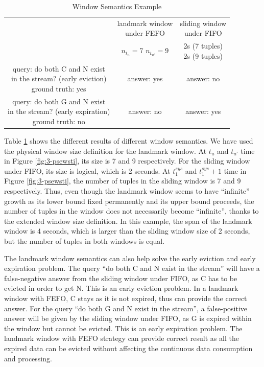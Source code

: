 \begin{table}[!htbp]
	\centering
	\caption{Window Semantics Example}
	\label{tab:lwsw}
	\begin{tabular}{|c||c|c|}
	\hline
	& \makecell{landmark window \\ under FEFO} & \makecell{sliding window \\ under FIFO} \\ \hhline{|=#=|=|}
	\makecell{window size} & \makecell{$n_{t_{u}} = 7$\\ $n_{t_{u'}} = 9$} & \makecell{2s (7 tuples)\\ 2s (9 tuples)} \\ \hline
	\makecell{query: do both C and N exist \\ in the stream? (early eviction) \\ ground truth: yes } & answer: yes  & answer: no \\ \hline
	\makecell{query: do both G and N exist \\ in the stream? (early expiration) \\ ground truth: no} & answer: no & answer: yes \\ \hline
	\end{tabular}
\end{table}

Table \ref{tab:lwsw} shows the different results of different window semantics. 
We have used the physical window size definition for the landmark window. 
At $t_{u}$ and $t_{u'}$ time in Figure \ref{fig:3-psewsti}, its size is 7 and 9 respectively. 
For the sliding window under FIFO, its size is logical, which is 2 seconds. 
At $t_{1}^{sys}$ and $t_{1}^{sys} + 1$ time in Figure \ref{fig:3-psewsti}, the number of tuples in the sliding window is 7 and 9 respectively.
Thus, even though the landmark window seems to have ``infinite'' growth as its lower bound fixed permanently and its upper bound proceeds, the number of tuples in the window does not necessarily become ``infinite'', thanks to the extended window size definition. 
In this example, the span of the landmark window is 4 seconds, which is larger than the sliding window size of 2 seconds, but the number of tuples in both windows is equal.

The landmark window semantics can also help solve the early eviction and early expiration problem. 
The query ``do both C and N exist in the stream'' will have a false-negative answer from the sliding window under FIFO, as C has to be evicted in order to get N. 
This is an early eviction problem.
In a landmark window with FEFO, C stays as it is not expired, thus can provide the correct answer. 
For the query ``do both G and N exist in the stream'', a false-positive answer will be given by the sliding window under FIFO, as G is expired within the window but cannot be evicted. 
This is an early expiration problem.
The landmark window with FEFO strategy can provide correct result as all the expired data can be evicted without affecting the continuous data consumption and processing.  
%

